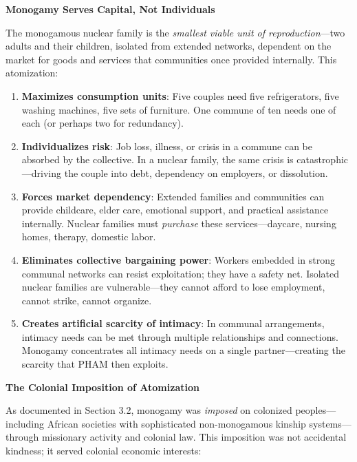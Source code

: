 \documentclass[12pt, letterpaper]{article}
\begin{document}
\textbf{Monogamy Serves Capital, Not Individuals}

The monogamous nuclear family is the \textit{smallest viable unit of reproduction}---two adults and their children, isolated from extended networks, dependent on the market for goods and services that communities once provided internally. This atomization:

\begin{enumerate}
    \item \textbf{Maximizes consumption units}: Five couples need five refrigerators, five washing machines, five sets of furniture. One commune of ten needs one of each (or perhaps two for redundancy).
    
    \item \textbf{Individualizes risk}: Job loss, illness, or crisis in a commune can be absorbed by the collective. In a nuclear family, the same crisis is catastrophic---driving the couple into debt, dependency on employers, or dissolution.
    
    \item \textbf{Forces market dependency}: Extended families and communities can provide childcare, elder care, emotional support, and practical assistance internally. Nuclear families must \textit{purchase} these services---daycare, nursing homes, therapy, domestic labor.
    
    \item \textbf{Eliminates collective bargaining power}: Workers embedded in strong communal networks can resist exploitation; they have a safety net. Isolated nuclear families are vulnerable---they cannot afford to lose employment, cannot strike, cannot organize.
    
    \item \textbf{Creates artificial scarcity of intimacy}: In communal arrangements, intimacy needs can be met through multiple relationships and connections. Monogamy concentrates all intimacy needs on a single partner---creating the scarcity that PHAM then exploits.
\end{enumerate}

\textbf{The Colonial Imposition of Atomization}

As documented in Section 3.2, monogamy was \textit{imposed} on colonized peoples---including African societies with sophisticated non-monogamous kinship systems---through missionary activity and colonial law. This imposition was not accidental kindness; it served colonial economic interests:
\end{document}
